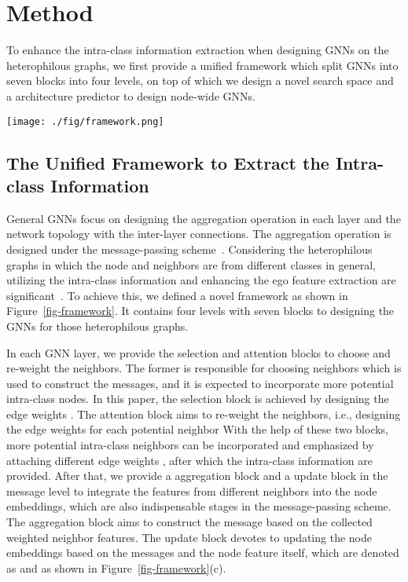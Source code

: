 \documentclass[sigconf]{acmart}
\begin{document}
\section{Method}


To enhance the intra-class information extraction when designing GNNs on the heterophilous graphs, we first provide a unified framework which split GNNs into seven blocks into four levels, on top of which we design a novel search space and a architecture predictor to design node-wide GNNs.




\begin{figure*}
	\centering
	\texttt{[image: ./fig/framework.png]}
	\caption{An overview of the proposed framework. (a) Each GNN layer contains two blocks in the Neighbor-level (as shown in (b)) and two blocks in the Message-level (as shown in (c)). (d-e) The designed Residual-merge and Inter-layer blocks in the Layer-level. (f) The designed output-merge block in the Network-level.
	}
	\label{fig-framework}
\end{figure*}


\subsection{The Unified Framework to Extract the Intra-class Information}	
General GNNs focus on designing the aggregation operation in each layer and the network topology with the inter-layer connections. The aggregation operation is designed under the message-passing scheme~\cite{gilmer2017neural}. 
Considering the heterophilous graphs in which the node and neighbors are from different classes in general, utilizing the intra-class information and enhancing the ego feature extraction are significant~\cite{zhu2020beyond,bo2021beyond,suresh2021breaking}. 
To achieve this, we defined a novel framework as shown in Figure~\ref{fig-framework}. 
It contains four levels with seven blocks to designing the GNNs for those heterophilous graphs.

In each GNN layer, we provide the selection and attention blocks to choose and re-weight the neighbors.  The former is responsible for choosing neighbors  which is used to construct the messages, and it is expected to incorporate more potential intra-class nodes.
In this paper, the selection block is achieved by designing the edge weights .
The attention block aims to re-weight the neighbors, i.e., designing the edge weights  for each potential neighbor
With the help of these two blocks, more potential intra-class neighbors can be incorporated and emphasized by attaching different edge weights , after which the intra-class information are provided.
After that, we provide a aggregation block and a update block in the message level to integrate the features from different neighbors into the node embeddings, which are also indispensable stages in the message-passing scheme.
The aggregation block aims to construct the message based on the collected weighted neighbor features.
The update block devotes to updating the node embeddings based on the messages and the node feature itself, which are denoted as  and  as shown in Figure~\ref{fig-framework}(c).
\end{document}
